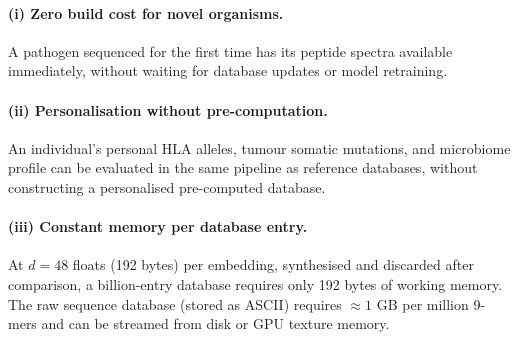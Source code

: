 \paragraph{(i) Zero build cost for novel organisms.}
A pathogen sequenced for the first time has its peptide spectra available
immediately, without waiting for database updates or model retraining.

\paragraph{(ii) Personalisation without pre-computation.}
An individual's personal HLA alleles, tumour somatic mutations, and microbiome
profile can be evaluated in the same pipeline as reference databases, without
constructing a personalised pre-computed database.

\paragraph{(iii) Constant memory per database entry.}
At $d = 48$ floats (192 bytes) per embedding, synthesised and discarded after
comparison, a billion-entry database requires only 192 bytes of working
memory. The raw sequence database (stored as ASCII) requires $\approx 1$ GB
per million 9-mers and can be streamed from disk or GPU texture memory.

